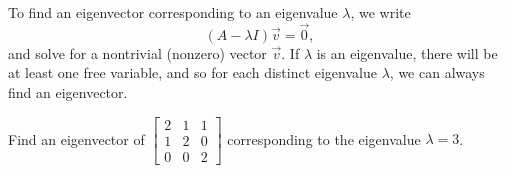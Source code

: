 \medskip

To find an eigenvector corresponding to an eigenvalue $\lambda$, we write
\begin{equation*}
(A-\lambda I) \vec{v} = \vec{0} ,
\end{equation*}
and solve for a nontrivial (nonzero) vector $\vec{v}$.
If $\lambda$ is an eigenvalue, there will be at least one
free variable, and so
for
each distinct eigenvalue $\lambda$, we can always find an eigenvector.

\begin{example}
Find an eigenvector of
$\left[ \begin{smallmatrix}
2 & 1 & 1 \\
1 & 2 & 0 \\
0 & 0 & 2
\end{smallmatrix} \right]$ corresponding to the eigenvalue $\lambda = 3$.


\end{example}
